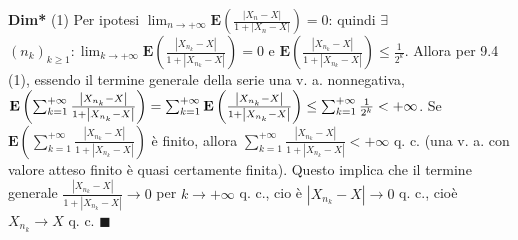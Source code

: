 \documentclass{article}
\begin{document}
\textbf{Dim*} (1) Per ipotesi $\lim_{n\rightarrow +\infty }\mathbf{E}\left( 
\frac{\left\vert X_{n}-X\right\vert }{1+\left\vert X_{n}-X\right\vert }%
\right) =0$: quindi $\exists $ $\left( n_{k}\right) _{k\geq
1}:\lim_{k\rightarrow +\infty }\mathbf{E}\left( \frac{\left\vert
X_{n_{k}}-X\right\vert }{1+\left\vert X_{n_{k}}-X\right\vert }\right) =0$ e $%
\mathbf{E}\left( \frac{\left\vert X_{n_{k}}-X\right\vert }{1+\left\vert
X_{n_{k}}-X\right\vert }\right) \leq \frac{1}{2^{k}}$. Allora per 9.4 (1),
essendo il termine generale della serie una v. a. nonnegativa, $\mathbf{E}%
\left( \sum_{k=1}^{+\infty }\frac{\left\vert X_{n_{k}}-X\right\vert }{%
1+\left\vert X_{n_{k}}-X\right\vert }\right) =\sum_{k=1}^{+\infty }\mathbf{E}%
\left( \frac{\left\vert X_{n_{k}}-X\right\vert }{1+\left\vert
X_{n_{k}}-X\right\vert }\right) \leq \sum_{k=1}^{+\infty }\frac{1}{2^{k}}%
<+\infty $. Se $\mathbf{E}\left( \sum_{k=1}^{+\infty }\frac{\left\vert
X_{n_{k}}-X\right\vert }{1+\left\vert X_{n_{k}}-X\right\vert }\right) $ \`{e}
finito, allora $\sum_{k=1}^{+\infty }\frac{\left\vert X_{n_{k}}-X\right\vert 
}{1+\left\vert X_{n_{k}}-X\right\vert }<+\infty $ q. c. (una v. a. con
valore atteso finito \`{e} quasi certamente finita). Questo implica che il
termine generale $\frac{\left\vert X_{n_{k}}-X\right\vert }{1+\left\vert
X_{n_{k}}-X\right\vert }\rightarrow 0$ per $k\rightarrow +\infty $ q. c., cio%
\`{e} $\left\vert X_{n_{k}}-X\right\vert \rightarrow 0$ q. c., cio\`{e} $%
X_{n_{k}}\rightarrow X$ q. c. $\blacksquare $
\end{document}
